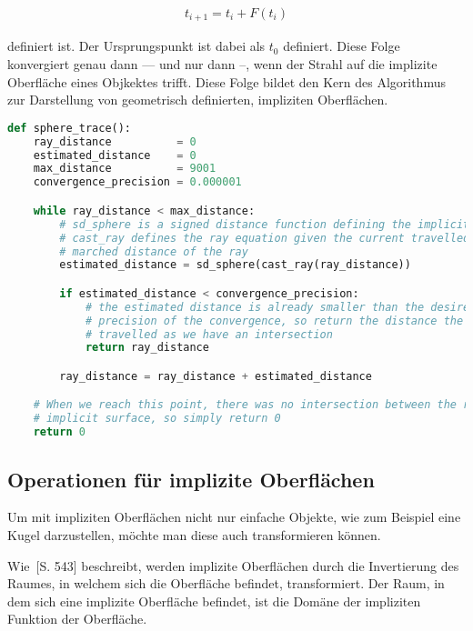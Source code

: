 \begin{gather}
    t_{i+1} = t_{i} + F(t_{i})
\end{gather}

definiert ist. Der Ursprungspunkt ist dabei als $t_{0}$ definiert. Diese Folge
konvergiert genau dann --- und nur dann --, wenn der Strahl auf die implizite
Oberfläche eines Objkektes trifft. Diese Folge bildet den Kern des Algorithmus
zur Darstellung von geometrisch definierten, impliziten Oberflächen.

\begin{lstlisting}[language=Python,caption={Eine abstrakte Umsetzung des Sphere
        Tracings\protect\footnotemark.},label={alg:sphere_tracing},captionpos=b,emph={sphere_trace}]
def sphere_trace():
    ray_distance          = 0
    estimated_distance    = 0
    max_distance          = 9001
    convergence_precision = 0.000001

    while ray_distance < max_distance:
        # sd_sphere is a signed distance function defining the implicit surface
        # cast_ray defines the ray equation given the current travelled /
        # marched distance of the ray
        estimated_distance = sd_sphere(cast_ray(ray_distance))

        if estimated_distance < convergence_precision:
            # the estimated distance is already smaller than the desired
            # precision of the convergence, so return the distance the ray has
            # travelled as we have an intersection
            return ray_distance

        ray_distance = ray_distance + estimated_distance

    # When we reach this point, there was no intersection between the ray and a
    # implicit surface, so simply return 0
    return 0
\end{lstlisting}

\subsection{Operationen für implizite Oberflächen}
\label{subsec:implicit_surfaces_ops}

Um mit impliziten Oberflächen nicht nur einfache Objekte, wie zum Beispiel eine
Kugel darzustellen, möchte man diese auch transformieren können.

Wie~\cite{hart_sphere_1994}[S. 543] beschreibt, werden implizite Oberflächen
durch die Invertierung des Raumes, in welchem sich die Oberfläche befindet,
transformiert. Der Raum, in dem sich eine implizite Oberfläche befindet, ist
die Domäne der impliziten Funktion der Oberfläche.

